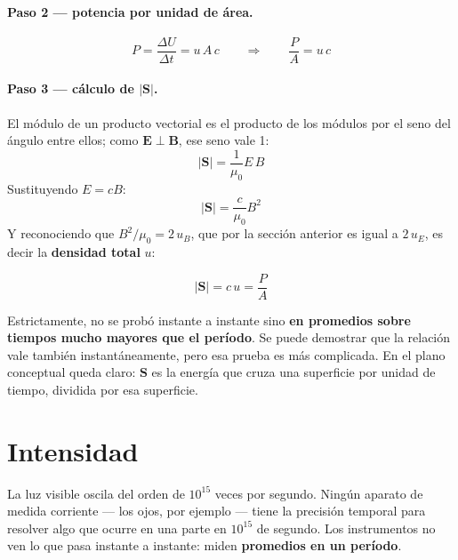\documentclass[12pt,a4paper]{article}
\begin{document}
\paragraph{Paso 2 --- potencia por unidad de área.}
\[
P = \frac{\Delta U}{\Delta t} = u\,A\,c
\qquad\Longrightarrow\qquad
\frac{P}{A} = u\,c
\]

\paragraph{Paso 3 --- cálculo de $|\mathbf{S}|$.}
El módulo de un producto vectorial es el producto de los módulos por el seno del
ángulo entre ellos; como $\mathbf{E} \perp \mathbf{B}$, ese seno vale 1:
\[
|\mathbf{S}| = \frac{1}{\mu_0}E\,B
\]
Sustituyendo $E = cB$:
\[
|\mathbf{S}| = \frac{c}{\mu_0}B^2
\]
Y reconociendo que $B^2/\mu_0 = 2\,u_B$, que por la sección anterior es igual a
$2\,u_E$, es decir la \textbf{densidad total} $u$:

\begin{keybox}[Resultado]
\[
\boxed{\ |\mathbf{S}| = c\,u = \frac{P}{A}\ }
\]
\end{keybox}



\begin{warnbox}
Estrictamente, no se probó instante a instante sino \textbf{en promedios sobre
tiempos mucho mayores que el período}. Se puede demostrar que la relación vale
también instantáneamente, pero esa prueba es más complicada. En el plano
conceptual queda claro: $\mathbf{S}$ es la energía que cruza una superficie por
unidad de tiempo, dividida por esa superficie.
\end{warnbox}

\section{Intensidad}

\begin{notebox}
La luz visible oscila del orden de $10^{15}$ veces por segundo. Ningún aparato de
medida corriente --- los ojos, por ejemplo --- tiene la precisión temporal para
resolver algo que ocurre en una parte en $10^{15}$ de segundo. Los instrumentos no
ven lo que pasa instante a instante: miden \textbf{promedios en un período}.
\end{notebox}
\end{document}
